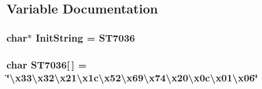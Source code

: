 \subsection{Variable Documentation}
\hypertarget{Uno__DS2408__LCD163_8ino_a62481bf733fae27fbf5f83e4a3582c1c}{
\subsubsection[{Init\-String}]{\setlength{\rightskip}{0pt plus 5cm}char$\ast$ Init\-String = {\bf S\-T7036}}}\label{Uno__DS2408__LCD163_8ino_a62481bf733fae27fbf5f83e4a3582c1c}
\hypertarget{Uno__DS2408__LCD163_8ino_a4db2cbb1ca779c9719d1a0f4d7ba5669}{
\subsubsection[{S\-T7036}]{\setlength{\rightskip}{0pt plus 5cm}char S\-T7036\mbox{[}$\,$\mbox{]} = \char`\"{}\textbackslash{}x33\textbackslash{}x32\textbackslash{}x21\textbackslash{}x1c\textbackslash{}x52\textbackslash{}x69\textbackslash{}x74\textbackslash{}x20\textbackslash{}x0c\textbackslash{}x01\textbackslash{}x06\char`\"{}}}\label{Uno__DS2408__LCD163_8ino_a4db2cbb1ca779c9719d1a0f4d7ba5669}
